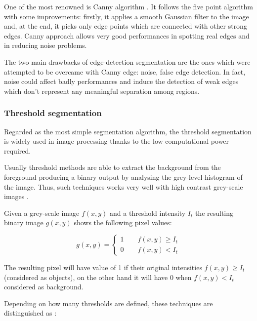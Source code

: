\documentclass[../main.tex]{subfiles}
\begin{document}
One of the most renowned is Canny algorithm \cite{Canny}. It follows the five point algorithm with some improvements: firstly, it applies a  smooth Gaussian filter to the image and, at the end, it picks only edge points which are connected with other strong edges. Canny approach allows very good performances in spotting real edges and in reducing noise problems\cite{saif2016gradient}.

The two main drawbacks of edge-detection segmentation are the ones which were attempted to be overcame with Canny edge: noise, false edge detection. In fact, noise could affect badly performances and induce the detection of weak edges which don't represent any meaningful separation among regions.



\subsubsection{\large{Threshold segmentation}}
 
Regarded as the most simple segmentation algorithm, the threshold segmentation is widely used in image processing thanks to the low computational power required. 

Usually threshold methods are able to extract the background from the foreground producing a binary output by analysing the grey-level histogram of the image. Thus, such techniques works very well with high contrast grey-scale images \cite{niu2019research-threshold-segmentaton}. 

Given a grey-scale image $f(x,y)$ and a threshold intensity $I_{t}$ the resulting binary image $g(x,y)$ shows the following pixel values:

\begin{equation}
    g(x,y) = \begin{cases}
                1 \qquad f(x,y) \ge I_{t} \\
                0 \qquad f(x,y) < I_{t} 
             \end{cases}
\end{equation}

The resulting pixel will have value of 1 if their original intensities $f(x,y) \ge I_{t}$ (considered as objects), on the other hand it will have 0 when $f(x,y) < I_{t}$ considered as background.

Depending on how many thresholds are defined, these techniques are distinguished as \cite{kang2009comparative}:
\end{document}
